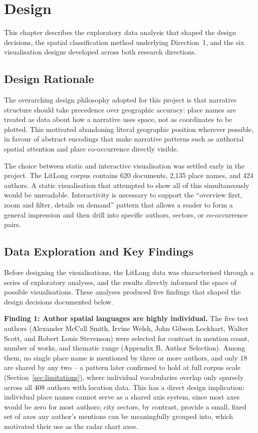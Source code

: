 \documentclass[logo,msc]{infthesis}
\begin{document}
 
\chapter{Design}
\label{chap:design}
This chapter describes the exploratory data analysis that shaped the design decisions, the spatial classification method underlying Direction~1, and the six visualisation designs developed across both research directions.
\section{Design Rationale}
The overarching design philosophy adopted for this project is that narrative structure should take precedence over geographic accuracy: place names are treated as data about how a narrative uses space, not as coordinates to be plotted. This motivated abandoning literal geographic position wherever possible, in favour of abstract encodings that make narrative patterns such as authorial spatial attention and place co-occurrence directly visible.
 
The choice between static and interactive visualisation was settled early in the project. The LitLong corpus contains 620 documents, 2,135 place names, and 424 authors. A static visualisation that attempted to show all of this simultaneously would be unreadable. Interactivity is necessary to support the ``overview first, zoom and filter, details on demand'' pattern \cite{shneiderman1996} that allows a reader to form a general impression and then drill into specific authors, sectors, or co-occurrence pairs.
 
\section{Data Exploration and Key Findings}

\label{sec:dataexploration}
 
Before designing the visualisations, the LitLong data was characterised through a series of exploratory analyses, and the results directly informed the space of possible visualisations. These analyses produced five findings that shaped the design decisions documented below.
 
\textbf{Finding 1: Author spatial languages are highly individual.} The five test authors (Alexander McCall Smith, Irvine Welsh, John Gibson Lockhart, Walter Scott, and Robert Louis Stevenson) were selected for contrast in mention count, number of works, and thematic range (Appendix B, Author Selection). Among them, no single place name is mentioned by three or more authors, and only 18 are shared by any two -- a pattern later confirmed to hold at full corpus scale (Section~\ref{sec:limitations}), where individual vocabularies overlap only sparsely across all 408 authors with location data. This has a direct design implication: individual place names cannot serve as a shared axis system, since most axes would be zero for most authors; city sectors, by contrast, provide a small, fixed set of axes any author's mentions can be meaningfully grouped into, which motivated their use as the radar chart axes.
\end{document}

